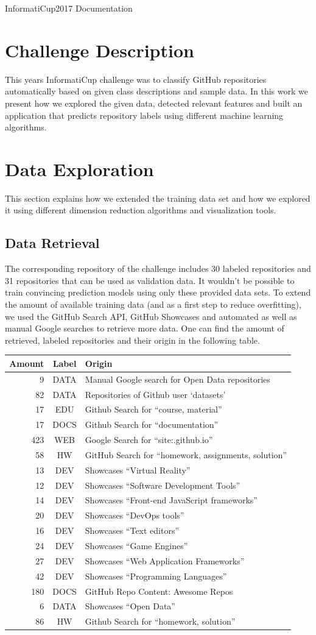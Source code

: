 \documentclass{article}
\begin{document}
InformatiCup2017 Documentation %

\section{Challenge Description}\label{challenge-description}

This years InformatiCup challenge was to classify GitHub repositories
automatically based on given class descriptions and sample data. In this
work we present how we explored the given data, detected relevant
features and built an application that predicts repository labels using
different machine learning algorithms.

\section{Data Exploration}\label{data-exploration}

This section explains how we extended the training data set and how we
explored it using different dimension reduction algorithms and
visualization tools.

\subsection{Data Retrieval}\label{data-retrieval}

The corresponding repository of the challenge includes 30 labeled
repositories and 31 repositories that can be used as validation data. It
wouldn't be possible to train convincing prediction models using only
these provided data sets. To extend the amount of available training
data (and as a first step to reduce overfitting), we used the GitHub
Search API, GitHub Showcases and automated as well as manual Google
searches to retrieve more data. One can find the amount of retrieved,
labeled repositories and their origin in the following table.

\begin{longtable}[]{@{}rcl@{}}
\toprule
Amount & Label & Origin\tabularnewline
\midrule
\endhead
9 & DATA & Manual Google search for Open Data
repositories\tabularnewline
82 & DATA & Repositories of Github user `datasets'\tabularnewline
17 & EDU & Github Search for ``course, material''\tabularnewline
17 & DOCS & Github Search for ``documentation''\tabularnewline
423 & WEB & Google Search for ``site:.github.io''\tabularnewline
58 & HW & GitHub Search for ``homework, assignments,
solution''\tabularnewline
13 & DEV & Showcases ``Virtual Reality''\tabularnewline
12 & DEV & Showcases ``Software Development Tools''\tabularnewline
14 & DEV & Showcases ``Front-end JavaScript frameworks''\tabularnewline
20 & DEV & Showcases ``DevOps tools''\tabularnewline
16 & DEV & Showcases ``Text editors''\tabularnewline
24 & DEV & Showcases ``Game Engines''\tabularnewline
27 & DEV & Showcases ``Web Application Frameworks''\tabularnewline
42 & DEV & Showcases ``Programming Languages''\tabularnewline
180 & DOCS & GitHub Repo Content: Awesome Repos\tabularnewline
6 & DATA & Showcases ``Open Data''\tabularnewline
86 & HW & Github Search for ``homework, solution''\tabularnewline
\bottomrule
\end{longtable}
\end{document}
